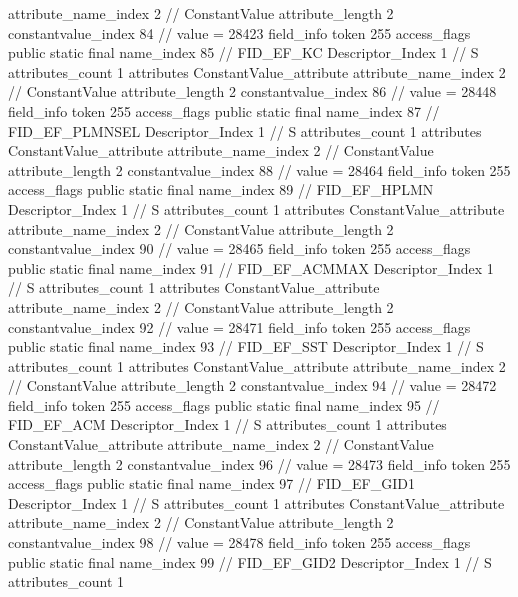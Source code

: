 {{{{{{{					attribute_name_index	2		// ConstantValue
					attribute_length	2
					constantvalue_index	84		// value = 28423
				}
				}
			}
			field_info {
				token	255
				access_flags	public static final
				name_index	85		// FID_EF_KC
				Descriptor_Index	1		// S
				attributes_count	1
				attributes {
				ConstantValue_attribute {
					attribute_name_index	2		// ConstantValue
					attribute_length	2
					constantvalue_index	86		// value = 28448
				}
				}
			}
			field_info {
				token	255
				access_flags	public static final
				name_index	87		// FID_EF_PLMNSEL
				Descriptor_Index	1		// S
				attributes_count	1
				attributes {
				ConstantValue_attribute {
					attribute_name_index	2		// ConstantValue
					attribute_length	2
					constantvalue_index	88		// value = 28464
				}
				}
			}
			field_info {
				token	255
				access_flags	public static final
				name_index	89		// FID_EF_HPLMN
				Descriptor_Index	1		// S
				attributes_count	1
				attributes {
				ConstantValue_attribute {
					attribute_name_index	2		// ConstantValue
					attribute_length	2
					constantvalue_index	90		// value = 28465
				}
				}
			}
			field_info {
				token	255
				access_flags	public static final
				name_index	91		// FID_EF_ACMMAX
				Descriptor_Index	1		// S
				attributes_count	1
				attributes {
				ConstantValue_attribute {
					attribute_name_index	2		// ConstantValue
					attribute_length	2
					constantvalue_index	92		// value = 28471
				}
				}
			}
			field_info {
				token	255
				access_flags	public static final
				name_index	93		// FID_EF_SST
				Descriptor_Index	1		// S
				attributes_count	1
				attributes {
				ConstantValue_attribute {
					attribute_name_index	2		// ConstantValue
					attribute_length	2
					constantvalue_index	94		// value = 28472
				}
				}
			}
			field_info {
				token	255
				access_flags	public static final
				name_index	95		// FID_EF_ACM
				Descriptor_Index	1		// S
				attributes_count	1
				attributes {
				ConstantValue_attribute {
					attribute_name_index	2		// ConstantValue
					attribute_length	2
					constantvalue_index	96		// value = 28473
				}
				}
			}
			field_info {
				token	255
				access_flags	public static final
				name_index	97		// FID_EF_GID1
				Descriptor_Index	1		// S
				attributes_count	1
				attributes {
				ConstantValue_attribute {
					attribute_name_index	2		// ConstantValue
					attribute_length	2
					constantvalue_index	98		// value = 28478
				}
				}
			}
			field_info {
				token	255
				access_flags	public static final
				name_index	99		// FID_EF_GID2
				Descriptor_Index	1		// S
				attributes_count	1
}}}}}
